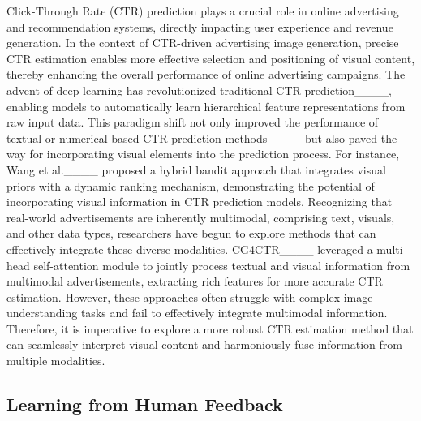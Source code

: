 Click-Through Rate (CTR) prediction plays a crucial role in online advertising and recommendation systems, directly impacting user experience and revenue generation. In the context of CTR-driven advertising image generation, precise CTR estimation enables more effective selection and positioning of visual content, thereby enhancing the overall performance of online advertising campaigns.
%
The advent of deep learning has revolutionized traditional CTR prediction____, enabling models to automatically learn hierarchical feature representations from raw input data.
%
This paradigm shift not only improved the performance of textual or numerical-based CTR prediction methods____ but also paved the way for incorporating visual elements into the prediction process.
%
For instance, Wang et al.____ proposed a hybrid bandit approach that integrates visual priors with a dynamic ranking mechanism, demonstrating the potential of incorporating visual information in CTR prediction models.
%
Recognizing that real-world advertisements are inherently multimodal, comprising text, visuals, and other data types, researchers have begun to explore methods that can effectively integrate these diverse modalities. CG4CTR____ leveraged a multi-head self-attention module to jointly process textual and visual information from multimodal advertisements, extracting rich features for more accurate CTR estimation.
%
However, these approaches often struggle with complex image understanding tasks and fail to effectively integrate multimodal information. Therefore, it is imperative to explore a more robust CTR estimation method that can seamlessly interpret visual content and harmoniously fuse information from multiple modalities.


\subsection{Learning from Human Feedback}


